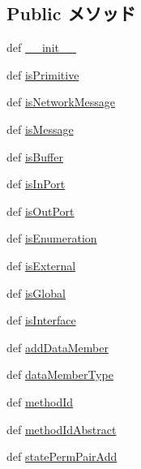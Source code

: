 \subsection*{Public メソッド}
\begin{DoxyCompactItemize}
\item 
def \hyperlink{classslicc_1_1symbols_1_1Type_1_1Type_ac775ee34451fdfa742b318538164070e}{\_\-\_\-init\_\-\_\-}
\item 
def \hyperlink{classslicc_1_1symbols_1_1Type_1_1Type_a45a24d63484ab10bacd544457ba77ecb}{isPrimitive}
\item 
def \hyperlink{classslicc_1_1symbols_1_1Type_1_1Type_aae25790df73780663d6afb3a7262665b}{isNetworkMessage}
\item 
def \hyperlink{classslicc_1_1symbols_1_1Type_1_1Type_a94bbf26edb7ac380f1b61e99fb45ffcf}{isMessage}
\item 
def \hyperlink{classslicc_1_1symbols_1_1Type_1_1Type_a83f4c7e23ed4de9a67fecb39999eeb80}{isBuffer}
\item 
def \hyperlink{classslicc_1_1symbols_1_1Type_1_1Type_a4ecffdf0fe4cb90efbaa76c057a77741}{isInPort}
\item 
def \hyperlink{classslicc_1_1symbols_1_1Type_1_1Type_a2095c07646682ecf212fb564006b19be}{isOutPort}
\item 
def \hyperlink{classslicc_1_1symbols_1_1Type_1_1Type_aae5f64366a63e72db2c8f64804d9d48d}{isEnumeration}
\item 
def \hyperlink{classslicc_1_1symbols_1_1Type_1_1Type_acc588405cef959f9be9b93c1ec0f2bf6}{isExternal}
\item 
def \hyperlink{classslicc_1_1symbols_1_1Type_1_1Type_ac99cb31b54c2509026d0986ed8cee4b0}{isGlobal}
\item 
def \hyperlink{classslicc_1_1symbols_1_1Type_1_1Type_aaf86a09de159b229b176e309e7435eaf}{isInterface}
\item 
def \hyperlink{classslicc_1_1symbols_1_1Type_1_1Type_a5fd45667498cb27660b6d124a7a6d297}{addDataMember}
\item 
def \hyperlink{classslicc_1_1symbols_1_1Type_1_1Type_aba05d1e636b4a17dc3fed9f793f31fd3}{dataMemberType}
\item 
def \hyperlink{classslicc_1_1symbols_1_1Type_1_1Type_a4ce953072a7b02c852dbd0346bcc6c68}{methodId}
\item 
def \hyperlink{classslicc_1_1symbols_1_1Type_1_1Type_ac0ea819ac12c659bd705db3a351250b9}{methodIdAbstract}
\item 
def \hyperlink{classslicc_1_1symbols_1_1Type_1_1Type_aaa063dc393243eb5ac92a55c327f52de}{statePermPairAdd}

\end{DoxyCompactItemize}
